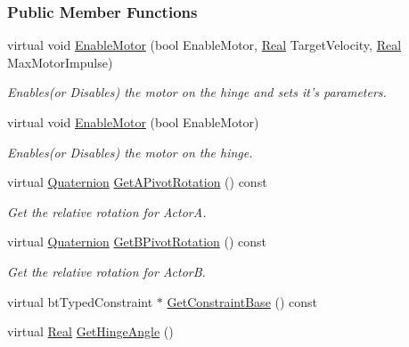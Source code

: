 \subsubsection*{Public Member Functions}
\begin{DoxyCompactItemize}
\item 
virtual void \hyperlink{classMezzanine_1_1HingeConstraint_a4a87201e6370d7ce29f967aecaf54d8e}{EnableMotor} (bool EnableMotor, \hyperlink{namespaceMezzanine_a726731b1a7df72bf3583e4a97282c6f6}{Real} TargetVelocity, \hyperlink{namespaceMezzanine_a726731b1a7df72bf3583e4a97282c6f6}{Real} MaxMotorImpulse)
\begin{DoxyCompactList}\small\item\em Enables(or Disables) the motor on the hinge and sets it's parameters. \item\end{DoxyCompactList}\item 
virtual void \hyperlink{classMezzanine_1_1HingeConstraint_a92a4d535a069ecb4dea600f7c4ac38ef}{EnableMotor} (bool EnableMotor)
\begin{DoxyCompactList}\small\item\em Enables(or Disables) the motor on the hinge. \item\end{DoxyCompactList}\item 
virtual \hyperlink{classMezzanine_1_1Quaternion}{Quaternion} \hyperlink{classMezzanine_1_1HingeConstraint_ab8b8a045c8338a3daeb970cb4696aab3}{GetAPivotRotation} () const 
\begin{DoxyCompactList}\small\item\em Get the relative rotation for ActorA. \item\end{DoxyCompactList}\item 
virtual \hyperlink{classMezzanine_1_1Quaternion}{Quaternion} \hyperlink{classMezzanine_1_1HingeConstraint_a574d375c6eac6f5d5b5f9c1266b85d60}{GetBPivotRotation} () const 
\begin{DoxyCompactList}\small\item\em Get the relative rotation for ActorB. \item\end{DoxyCompactList}\item 
virtual btTypedConstraint $\ast$ \hyperlink{classMezzanine_1_1HingeConstraint_a04c77dee8074b293d9db893e1af42608}{GetConstraintBase} () const 
\item 
virtual \hyperlink{namespaceMezzanine_a726731b1a7df72bf3583e4a97282c6f6}{Real} \hyperlink{classMezzanine_1_1HingeConstraint_aaf946de046cc59210ae1f70ce53629e5}{GetHingeAngle} ()

\end{DoxyCompactItemize}
